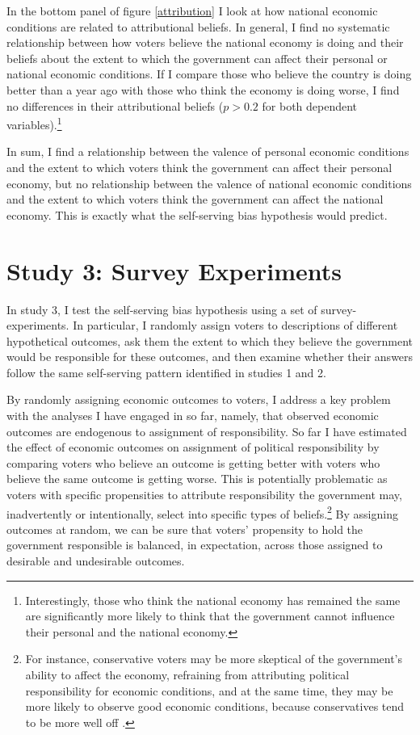 \documentclass[a4paper,11pt]{article}
\begin{document}
	In the bottom panel of figure \ref{attribution} I look at how national economic conditions are related to attributional beliefs. In general, I find no systematic relationship between how voters believe the national economy is doing and their beliefs about the extent to which the government can affect their personal or national economic conditions. If I compare those who believe the country is doing better than a year ago with those who think the economy is doing worse, I find no differences in their attributional beliefs ($p>0.2$ for both dependent variables).\footnote{Interestingly, those who think the national economy has remained the same are significantly more likely to think that the government cannot influence their personal and the national economy.}
	
	
	In sum, I find a relationship between the valence of personal economic conditions and the extent to which voters think the government can affect their personal economy, but no relationship between the valence of national economic conditions and the extent to which voters think the government can affect the national economy. This is exactly what the self-serving bias hypothesis would predict.
	
	\section{Study 3: Survey Experiments}
	In study 3, I test the self-serving bias hypothesis using a set of  survey-experiments. In particular, I randomly assign voters to descriptions of different hypothetical outcomes, ask them the extent to which they believe the government would be responsible for these outcomes, and then examine whether their answers follow the same self-serving pattern identified in studies 1 and 2.
	
	By randomly assigning economic outcomes to voters, I address a key problem with the analyses I have engaged in so far, namely, that observed economic outcomes are endogenous to assignment of responsibility. So far I have estimated the effect of economic outcomes on assignment of political responsibility by comparing voters who believe an outcome is getting better with voters who believe the same outcome is getting worse. This is potentially problematic as voters with specific propensities to attribute responsibility the government may, inadvertently or intentionally, select into specific types of beliefs.\footnote{For instance, conservative voters may be more skeptical of the government's ability to affect the economy, refraining from attributing political responsibility for economic conditions, and at the same time, they may be more likely to observe good economic conditions, because conservatives tend to be more well off \citep{rudolph2003s,rudolph2006triangulating}.} By assigning outcomes at random, we can be sure that voters' propensity to hold the government responsible is balanced, in expectation, across those assigned to desirable and undesirable outcomes.
	
\end{document}
